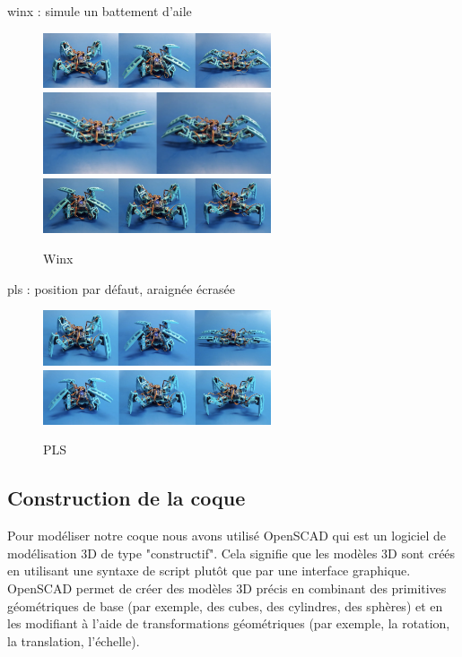 winx : simule un battement d'aile

\begin{figure}
	\begin{center}
		\includegraphics[width=0.6\textwidth]{./img/winx_1}
		\includegraphics[width=0.6\textwidth]{./img/winx_2}
		\includegraphics[width=0.6\textwidth]{./img/winx_3}
		\caption{Winx}
	\end{center}
\end{figure}

pls : position par défaut, araignée écrasée

\begin{figure}
	\begin{center}
		\includegraphics[width=0.6\textwidth]{./img/pls_1}
		\includegraphics[width=0.6\textwidth]{./img/pls_2}
		\caption{PLS}
	\end{center}
\end{figure}

		\subsection{Construction de la coque}

Pour modéliser notre coque nous avons utilisé OpenSCAD qui est un logiciel de modélisation 3D de type "constructif". Cela signifie que les modèles 3D sont créés en utilisant une syntaxe de script plutôt que par une interface graphique. OpenSCAD permet de créer des modèles 3D précis en combinant des primitives géométriques de base (par exemple, des cubes, des cylindres, des sphères) et en les modifiant à l'aide de transformations géométriques (par exemple, la rotation, la translation, l'échelle).  
\linebreak

